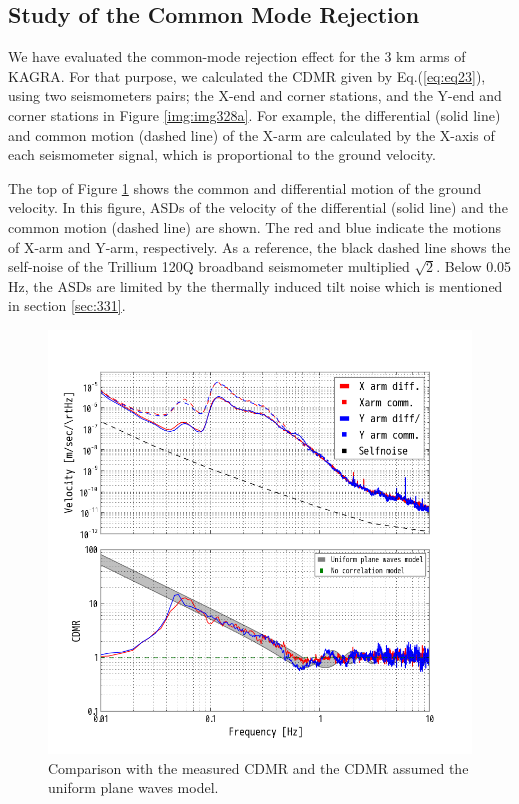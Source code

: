 \subsection{Study of the Common Mode Rejection} \label{sec:333}
We have evaluated the common-mode rejection effect for the 3 km arms of KAGRA. For that purpose, we calculated the CDMR given by Eq.(\ref{eq:eq23}), using two seismometers pairs; the X-end and corner stations, and the Y-end and corner stations in Figure \ref{img:img328a}. For example, the differential (solid line) and common motion (dashed line) of the X-arm are calculated by the X-axis of each seismometer signal, which is proportional to the ground velocity. 

The top of Figure \ref{img:img319} shows the common and differential motion of the ground velocity. In this figure, ASDs of the velocity of the differential (solid line) and the common motion (dashed line) are shown. The red and blue indicate the motions of X-arm and Y-arm, respectively. As a reference, the black dashed line shows the self-noise of the Trillium 120Q broadband seismometer multiplied $\sqrt{2}$. Below 0.05 Hz, the ASDs are limited by the thermally induced tilt noise which is mentioned in section \cref{sec:331}. 

\begin{figure}[h]
    \begin{center}   
      \includegraphics[width=13.0cm]{./img_chap3/img319.png}
      \caption{Comparison with the measured CDMR and the CDMR assumed the uniform plane waves model.}\label{img:img319}
    \end{center}
\end{figure}

